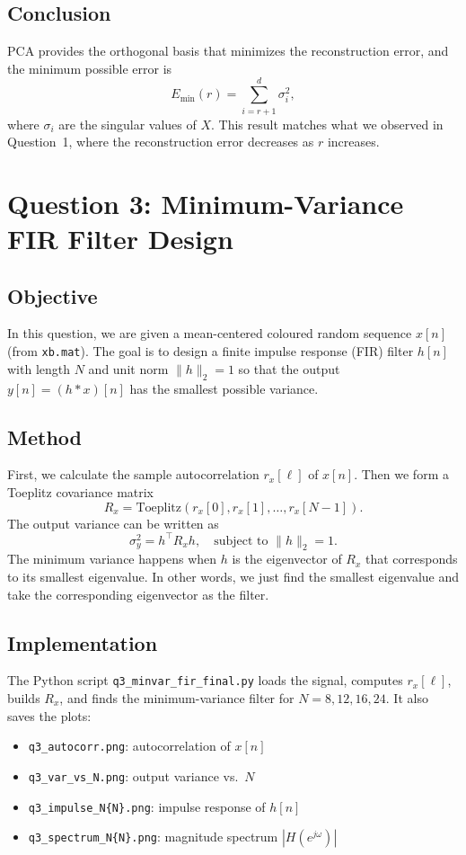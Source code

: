 \documentclass[12pt,a4paper]{article}
\begin{document}
\subsection{Conclusion}
PCA provides the orthogonal basis that minimizes the reconstruction error,
and the minimum possible error is
\[
E_{\min}(r) = \sum_{i=r+1}^{d} \sigma_i^2,
\]
where $\sigma_i$ are the singular values of $X$.
This result matches what we observed in Question~1, where the reconstruction error decreases as $r$ increases.

\newpage
\section{Question 3: Minimum-Variance FIR Filter Design}

\subsection{Objective}
In this question, we are given a mean-centered coloured random sequence $x[n]$ (from \texttt{xb.mat}).  
The goal is to design a finite impulse response (FIR) filter $h[n]$ with length $N$ and unit norm $\|h\|_2 = 1$ so that the output $y[n]=(h*x)[n]$ has the smallest possible variance.

\subsection{Method}
First, we calculate the sample autocorrelation $r_x[\ell]$ of $x[n]$.  
Then we form a Toeplitz covariance matrix
\[
R_x = \mathrm{Toeplitz}(r_x[0], r_x[1], \ldots, r_x[N-1]).
\]
The output variance can be written as
\[
\sigma_y^2 = h^\top R_x h, \quad \text{subject to } \|h\|_2 = 1.
\]
The minimum variance happens when $h$ is the eigenvector of $R_x$ that corresponds to its smallest eigenvalue.  
In other words, we just find the smallest eigenvalue and take the corresponding eigenvector as the filter.

\subsection{Implementation}
The Python script \texttt{q3\_minvar\_fir\_final.py} loads the signal, computes $r_x[\ell]$, builds $R_x$, and finds the minimum-variance filter for $N=8,12,16,24$.  
It also saves the plots:
\begin{itemize}
    \item \texttt{q3\_autocorr.png}: autocorrelation of $x[n]$
    \item \texttt{q3\_var\_vs\_N.png}: output variance vs.\ $N$
    \item \texttt{q3\_impulse\_N\{N\}.png}: impulse response of $h[n]$
    \item \texttt{q3\_spectrum\_N\{N\}.png}: magnitude spectrum $|H(e^{j\omega})|$
\end{itemize}
\end{document}
